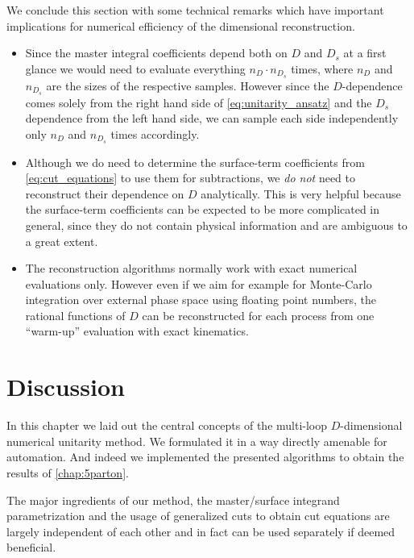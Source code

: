 We conclude this section with some technical remarks which
have important implications for numerical efficiency of the dimensional reconstruction.
\begin{itemize}
  \item Since the master integral coefficients depend both on $D$ and  $D_s$ at a first glance we would
    need to evaluate everything $n_D \cdot n_{D_s}$ times, where $n_D$ and $n_{D_s}$ are the sizes of the respective samples.
    However since the $D$-dependence comes solely from the right hand side of \cref{eq:unitarity_ansatz}
   and the $D_s$ dependence from the left hand side, we can sample each side independently only $n_D$ and $n_{D_s}$ times
   accordingly.
 \item Although we do need to determine the surface-term coefficients from \cref{eq:cut_equations} to use them for subtractions,
   we \textit{do not} need to reconstruct their dependence on $D$ analytically. 
   This is very helpful because the surface-term coefficients can be expected to be more complicated in general,
   since they do not contain physical information and are ambiguous to a great extent.
 \item The reconstruction algorithms normally work with exact numerical evaluations only.
   However even if we aim for example for Monte-Carlo integration over external phase space using floating point numbers,
   the rational functions of $D$ can be reconstructed for each process from one ``warm-up'' evaluation with exact kinematics.
\end{itemize}

\section{Discussion}
In this chapter we laid out the central concepts of the multi-loop $D$-dimensional numerical unitarity method.
We formulated it in a way directly amenable for automation.
And indeed we implemented the presented algorithms to obtain the results of \cref{chap:5parton}.

The major ingredients of our method, 
the master/surface integrand parametrization and
the usage of generalized cuts to obtain cut equations
are largely independent of each other and in fact 
can be used separately if deemed beneficial.

